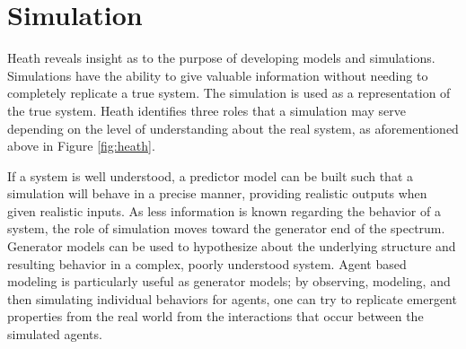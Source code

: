 \documentclass[12pt]{report}
\begin{document}
\section{Simulation}
Heath \cite{Heath.2010} reveals insight as to the purpose of developing models and simulations. Simulations have the ability to give valuable information without needing to completely replicate a true system. The simulation is used as a representation of the true system. Heath identifies three roles that a simulation may serve depending on the level of understanding about the real system, as aforementioned above in Figure \ref{fig:heath}.

If a system is well understood, a predictor model can be built such that a simulation will behave in a precise manner, providing realistic outputs when given realistic inputs. As less information is known regarding the behavior of a system, the role of simulation moves toward the generator end of the spectrum. Generator models can be used to hypothesize about the underlying structure and resulting behavior in a complex, poorly understood system. Agent based modeling is particularly useful as generator models; by observing, modeling, and then simulating individual behaviors for agents, one can try to replicate emergent properties from the real world from the interactions that occur between the simulated agents. 
\end{document}
